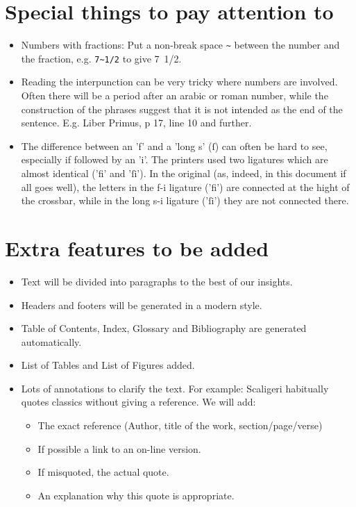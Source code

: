 \documentclass{report}
\begin{document}
\section{Special things to pay attention to}
\begin{itemize}
\item Numbers with fractions: Put a non-break space \verb+~+ between the number
and the fraction, e.g. \verb+7~1/2+ to give 7~1/2.
\item Reading the interpunction can be very tricky where numbers are involved.
Often there will be a period after an arabic or roman number, while the
construction of the phrases suggest that it is not intended as the end of 
the sentence. E.g. Liber Primus, p 17, line 10 and further.
\item The difference between an 'f' and a 'long s' (ſ) can often be hard to see,
 especially if followed by an 'i'. The printers used two ligatures which are
 almost identical ('fi' and 'ſi'). In the original (as, indeed, in this
 document if all goes well), the letters in the f-i ligature ('fi') are
 connected at the hight of the crossbar, while in the long s-i ligature ('ſi')
 they are not connected there.
\end{itemize}

\section{Extra features to be added}
\begin{itemize}
\item Text will be divided into paragraphs to the best of our insights.
\item Headers and footers will be generated in a modern style.
\item Table of Contents, Index, Glossary and Bibliography are generated
automatically.
\item List of Tables and List of Figures added.
\item Lots of annotations to clarify the text.
For example: Scaligeri habitually quotes classics without giving a reference.
We will add:
    \begin{itemize}
    \item The exact reference (Author, title of the work, section/page/verse)
    \item If possible a link to an on-line version.
    \item If misquoted, the actual quote.
    \item An explanation why this quote is appropriate.
    \end{itemize}
\end{itemize}
\end{document}
